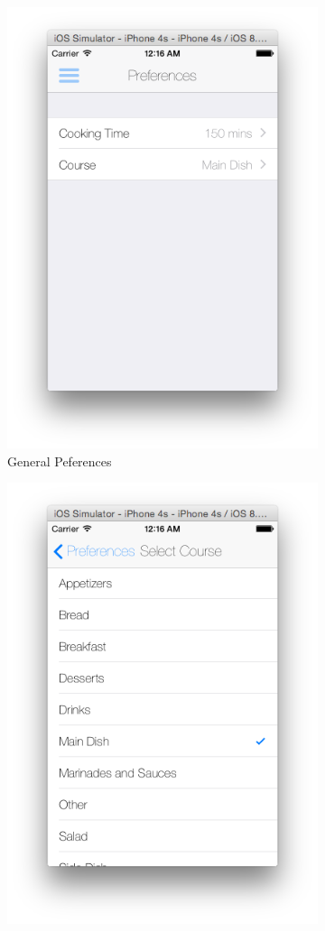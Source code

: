 	  \begin{figure}[h]
	  	\begin{subfigure}{.32\textwidth}
	  		\includegraphics[width=.75\linewidth]{figures/ch4_app_screen_shots/preferences/peferences.png}
	  		\caption{General Peferences}
	  	\end{subfigure}
	  	\begin{subfigure}{.32\textwidth}
	  		\includegraphics[width=.75\linewidth]{figures/ch4_app_screen_shots/preferences/peferences_course.png}

\end{subfigure}
\end{figure}
